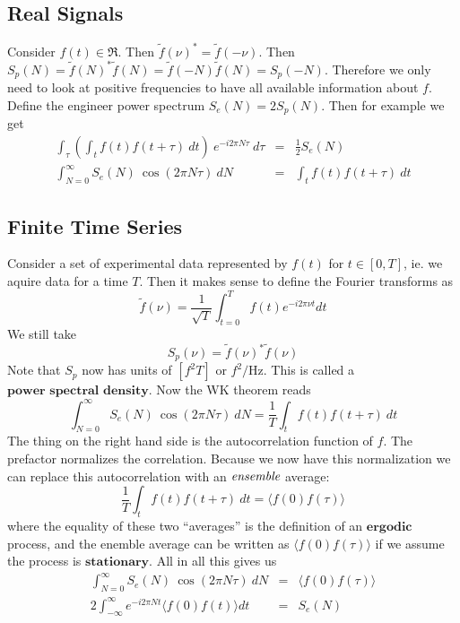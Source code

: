 \documentclass{article}
\begin{document}
\subsection*{Real Signals}

Consider $f(t)\in\Re$. Then $\tilde{f}(\nu)^{*}=\tilde{f}(-\nu)$.
Then $S_{p}(N)=\tilde{f}(N)^{*}\tilde{f}(N)=\tilde{f}(-N)\tilde{f}(N)=S_{p}(-N)$.
Therefore we only need to look at positive frequencies to have all
available information about $f$. Define the engineer power spectrum
$S_{e}(N)=2S_{p}(N)$. Then for example we get \begin{eqnarray*}
\int_{\tau}\left(\int_{t}f(t)f(t+\tau)~dt\right)\: e^{-i2\pi N\tau}\: d\tau & = & \frac{1}{2}S_{e}(N)\\
\int_{N=0}^{\infty}S_{e}(N)\:\cos(2\pi N\tau)\: dN & = & \int_{t}f(t)f(t+\tau)\: dt\end{eqnarray*}

\subsection*{Finite Time Series}

Consider a set of experimental data represented by $f(t)$ for $t\in[0,T]$,
ie. we aquire data for a time $T$. Then it makes sense to define
the Fourier transforms as\[
\tilde{f}(\nu)=\frac{1}{\sqrt{T}}\int_{t=0}^{T}f(t)e^{-i2\pi\nu t}dt\]
 We still take\[
S_{p}(\nu)=\tilde{f}(\nu)^{*}\tilde{f}(\nu)\]
 Note that $S_{p}$ now has units of $[f^{2}T]$ or $f^{2}/\textrm{Hz}$.
This is called a $\textbf{power spectral density}$. Now the WK theorem
reads\[
\int_{N=0}^{\infty}S_{e}(N)\:\cos\left(2\pi N\tau\right)\: dN=\frac{1}{T}\int_{t}f(t)f(t+\tau)\: dt\]
 The thing on the right hand side is the autocorrelation function
of $f$. The prefactor normalizes the correlation. Because we now
have this normalization we can replace this autocorrelation with an
$\emph{ensemble}$ average:\[
\frac{1}{T}\int_{t}f(t)f(t+\tau)\: dt=\langle f(0)f(\tau)\rangle\]
 where the equality of these two {}``averages'' is the definition
of an $\textbf{ergodic}$ process, and the enemble average can be
written as $\langle f(0)f(\tau)\rangle$ if we assume the process
is $\textbf{stationary}$. All in all this gives us\begin{eqnarray*}
\int_{N=0}^{\infty}S_{e}(N)\:\cos\left(2\pi N\tau\right)\: dN & = & \langle f(0)f(\tau)\rangle\\
2\int_{-\infty}^{\infty}e^{-i2\pi Nt}\langle f(0)f(t)\rangle dt & = & S_{e}(N)\end{eqnarray*}
\end{document}
